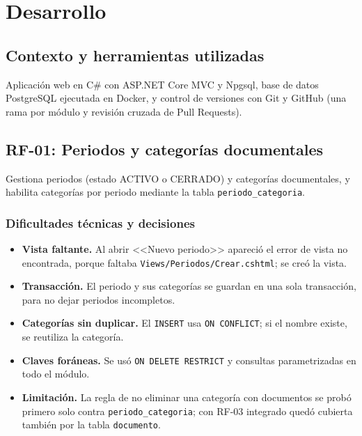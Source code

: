 \documentclass[12pt,a4paper,oneside]{article}
\begin{document}
\section{Desarrollo}
\subsection{Contexto y herramientas utilizadas}
Aplicación web en C\# con ASP.NET Core MVC y Npgsql, base de datos PostgreSQL ejecutada en Docker, y control de versiones con Git y GitHub (una rama por módulo y revisión cruzada de Pull Requests).

\subsection{RF-01: Periodos y categorías documentales}
Gestiona periodos (estado ACTIVO o CERRADO) y categorías documentales, y habilita categorías por periodo mediante la tabla \texttt{periodo\_categoria}.

\subsubsection{Dificultades técnicas y decisiones}
\begin{itemize}[leftmargin=1.8em,itemsep=3pt]
\item \textbf{Vista faltante.} Al abrir <<Nuevo periodo>> apareció el error de vista no encontrada, porque faltaba \texttt{Views/Periodos/Crear.cshtml}; se creó la vista.
\item \textbf{Transacción.} El periodo y sus categorías se guardan en una sola transacción, para no dejar periodos incompletos.
\item \textbf{Categorías sin duplicar.} El \texttt{INSERT} usa \texttt{ON CONFLICT}; si el nombre existe, se reutiliza la categoría.
\item \textbf{Claves foráneas.} Se usó \texttt{ON DELETE RESTRICT} y consultas parametrizadas en todo el módulo.
\item \textbf{Limitación.} La regla de no eliminar una categoría con documentos se probó primero solo contra \texttt{periodo\_categoria}; con RF-03 integrado quedó cubierta también por la tabla \texttt{documento}.
\end{itemize}
\end{document}
